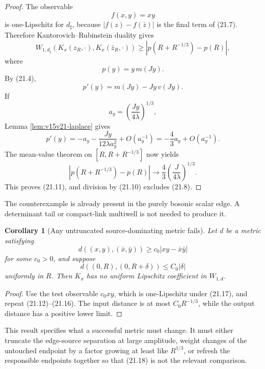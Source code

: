 \documentclass[11pt]{article}
\newtheorem{corollary}[theorem]{Corollary}
\theoremstyle{remark}
\begin{document}
\begin{proof}
The observable
\[
 f(x,y)=xy
\]
is one-Lipschitz for \(d_\sharp\), because
\(|f(z)-f(\bar z)|\) is the final term of (21.7).  Therefore
Kantorovich--Rubinstein duality gives
\[
 W_{1,d_\sharp}(K_x(z_R,\cdot),K_x(\bar z_R,\cdot))
 \ge|p(R+R^{-1/3})-p(R)|,                                  \tag{21.12}
\]
where
\[
 p(y)=y\,m(Jy).                                             \tag{21.13}
\]
By (21.4),
\[
 p'(y)=m(Jy)-Jy\,v(Jy).                                     \tag{21.14}
\]
If
\[
 a_y=\left(\frac{Jy}{4\lambda}\right)^{1/3},
\]
Lemma \ref{lem:v15v21-laplace} gives
\[
 p'(y)
 =
 -a_y-\frac{Jy}{12\lambda a_y^2}+O(a_y^{-1})
 =
 -\frac43a_y+O(a_y^{-1}).                                  \tag{21.15}
\]
The mean-value theorem on
\([R,R+R^{-1/3}]\) now yields
\[
 |p(R+R^{-1/3})-p(R)|
 \longrightarrow
 \frac43\left(\frac{J}{4\lambda}\right)^{1/3}.              \tag{21.16}
\]
This proves (21.11), and division by (21.10) excludes (21.8).
\end{proof}

The counterexample is already present in the purely bosonic scalar
edge.  A determinant tail or compact-link multiwell is not needed
to produce it.

\begin{corollary}[Any untruncated source-dominating metric fails]
\label{cor:v15v21-source-dominating}
Let \(d\) be a metric satisfying
\[
 d((x,y),(\bar x,\bar y))
 \ge c_0|xy-\bar x\bar y|                                   \tag{21.17}
\]
for some \(c_0>0\), and suppose
\[
 d((0,R),(0,R+\delta))\le C_0|\delta|                       \tag{21.18}
\]
uniformly in \(R\).  Then \(K_x\) has no uniform Lipschitz
coefficient in \(W_{1,d}\).
\end{corollary}

\begin{proof}
Use the test observable \(c_0xy\), which is one-Lipschitz under
(21.17), and repeat (21.12)--(21.16).  The input distance is at
most \(C_0R^{-1/3}\), while the output distance has a positive
lower limit.
\end{proof}

This result specifies what a successful metric must change.  It
must either truncate the edge-source separation at large amplitude,
weight changes of the untouched endpoint by a factor growing at
least like \(R^{1/3}\), or refresh the responsible endpoints
together so that (21.18) is not the relevant comparison.
\end{document}
